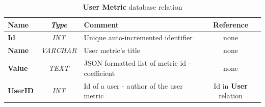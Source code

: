 		\begin{table}[t]
			\centering
			\begin{tabularx}{\textwidth}{@{} >{\bf}Y >{\em}c l c @{}} %
				\toprule
				Name	& Type			& Comment											& Reference						\\
				\midrule
				
				Id		& INT			& Unique auto-incremented identifier				& none							\\
				Name	& VARCHAR		& User metric's title								& none							\\
				Value	& TEXT			& JSON formatted list of metric id - coefficient	& none							\\
				UserID	& INT			& Id of a user - author of the user metric			& Id in \textbf{User} relation	\\
				
				\bottomrule
			\end{tabularx}
			\caption{\textbf{User Metric} database relation}
			\label{umetrictable}
		\end{table}
